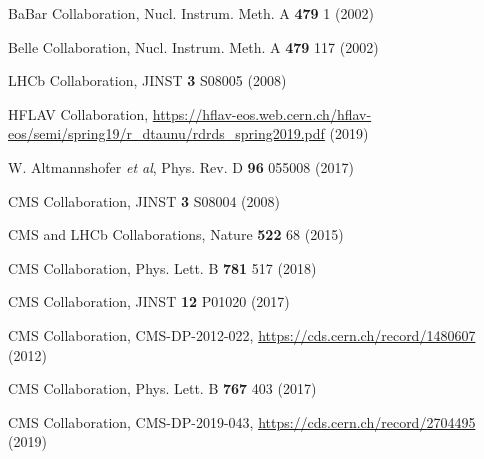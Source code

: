 \documentclass{webofc}
\begin{document}
\begin{thebibliography}{}

BaBar Collaboration, Nucl. Instrum. Meth. A \textbf{479} 1 (2002)

Belle Collaboration, Nucl. Instrum. Meth. A \textbf{479} 117 (2002)

LHCb Collaboration, JINST \textbf{3} S08005 (2008) 

HFLAV Collaboration, \url{https://hflav-eos.web.cern.ch/hflav-eos/semi/spring19/r_dtaunu/rdrds_spring2019.pdf} (2019) 

W. Altmannshofer \textit{et al}, Phys. Rev. D \textbf{96} 055008 (2017)

CMS Collaboration, JINST \textbf{3} S08004 (2008)

CMS and LHCb Collaborations, Nature \textbf{522} 68 (2015)

CMS Collaboration, Phys. Lett. B \textbf{781} 517 (2018) 

CMS Collaboration, JINST \textbf{12} P01020 (2017)

CMS Collaboration, CMS-DP-2012-022, \url{https://cds.cern.ch/record/1480607} (2012)

CMS Collaboration, Phys. Lett. B \textbf{767} 403 (2017)

CMS Collaboration, CMS-DP-2019-043, \url{https://cds.cern.ch/record/2704495} (2019)

\end{thebibliography}
\end{document}
